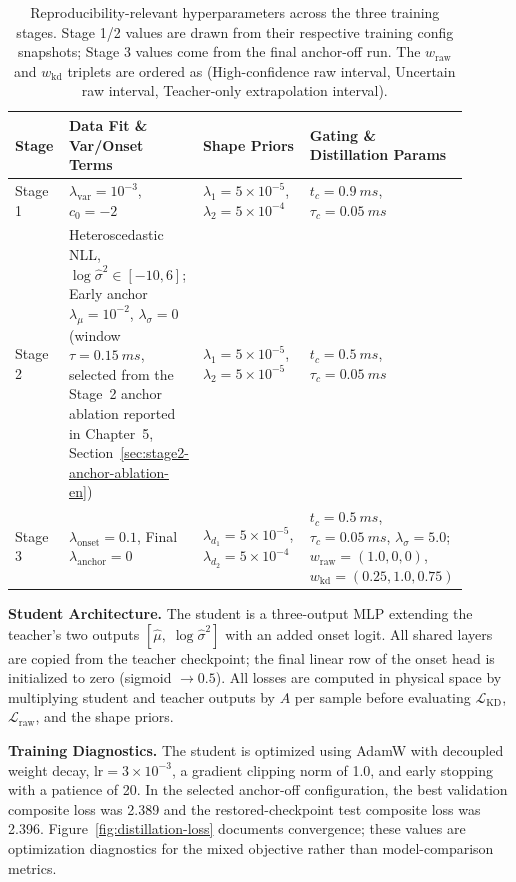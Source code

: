 \begin{table}[!ht]
\centering
\footnotesize
\setlength{\tabcolsep}{3pt}
\renewcommand{\arraystretch}{1.18}
\begin{tabular}{@{}L{0.12\linewidth}L{0.24\linewidth}L{0.24\linewidth}L{0.30\linewidth}@{}}
\toprule
Stage & Data Fit \& Var/Onset Terms & Shape Priors & Gating \& Distillation Params \\
\midrule
Stage 1 &
\(\lambda_{\mathrm{var}}=10^{-3}\), \(c_0=-2\) &
\(\lambda_1=5\times10^{-5}\), \(\lambda_2=5\times10^{-4}\) &
\(t_c=\SI{0.9}{ms}\), \(\tau_c=\SI{0.05}{ms}\) \\
Stage 2 &
Heteroscedastic NLL, \(\log\hat{\sigma}^2\in[-10,6]\); Early anchor \(\lambda_\mu=10^{-2}\), \(\lambda_\sigma=0\) (window \(\tau=\SI{0.15}{ms}\), selected from the Stage~2 anchor ablation reported in Chapter~5, Section~\ref{sec:stage2-anchor-ablation-en}) &
\(\lambda_1=5\times10^{-5}\), \(\lambda_2=5\times10^{-5}\) &
\(t_c=\SI{0.5}{ms}\), \(\tau_c=\SI{0.05}{ms}\) \\
Stage 3 &
\(\lambda_{\mathrm{onset}}=0.1\), Final \(\lambda_{\mathrm{anchor}}=0\) &
\(\lambda_{d_1}=5\times10^{-5}\), \(\lambda_{d_2}=5\times10^{-4}\) &
\(t_c=\SI{0.5}{ms}\), \(\tau_c=\SI{0.05}{ms}\), \(\lambda_\sigma=5.0\); \(w_{\mathrm{raw}}=(1.0,0,0)\), \(w_{\mathrm{kd}}=(0.25,1.0,0.75)\) \\
\bottomrule
\end{tabular}
\caption{Reproducibility-relevant hyperparameters across the three training stages. Stage 1/2 values are drawn from their respective training config snapshots; Stage 3 values come from the final anchor-off run. The \(w_{\mathrm{raw}}\) and \(w_{\mathrm{kd}}\) triplets are ordered as (High-confidence raw interval, Uncertain raw interval, Teacher-only extrapolation interval).}
\label{tab:training-hyperparameters}
\end{table}

\textbf{Student Architecture.} The student is a three-output MLP extending the teacher's two outputs $[\hat\mu,\;\log\hat\sigma^2]$ with an added onset logit. All shared layers are copied from the teacher checkpoint; the final linear row of the onset head is initialized to zero (sigmoid $\to0.5$). All losses are computed in physical space by multiplying student and teacher outputs by $A$ per sample before evaluating $\mathcal{L}_{\mathrm{KD}}$, $\mathcal{L}_{\mathrm{raw}}$, and the shape priors.

\textbf{Training Diagnostics.} The student is optimized using AdamW with decoupled weight decay, $\mathrm{lr}=3\times10^{-3}$, a gradient clipping norm of 1.0, and early stopping with a patience of 20. In the selected anchor-off configuration, the best validation composite loss was 2.389 and the restored-checkpoint test composite loss was 2.396. Figure~\ref{fig:distillation-loss} documents convergence; these values are optimization diagnostics for the mixed objective rather than model-comparison metrics.

